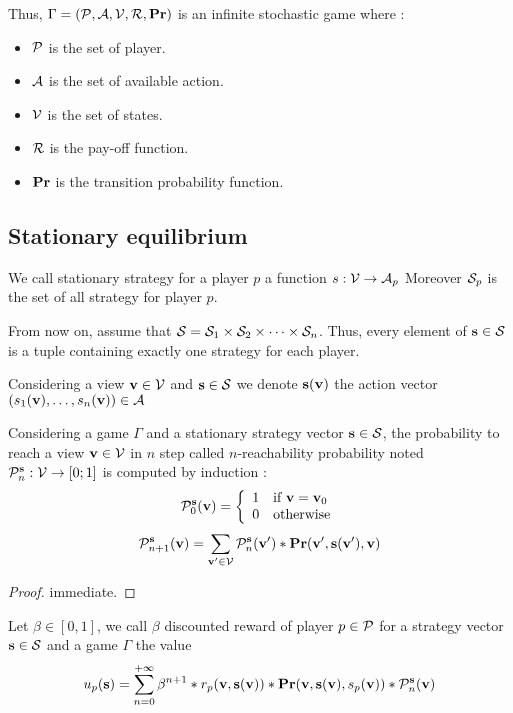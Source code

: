 Thus, $\Gamma = (\mathcal{P},\mathcal{A},\mathcal{V},\mathcal{R},\mathbf{Pr})$ is an infinite stochastic game where :
\begin{itemize}
	\item $\mathcal{P}$ is the set of player.
	\item $\mathcal{A}$ is the set of available action.
	\item $\mathcal{V}$ is the set of states.
	\item $\mathcal{R}$ is the pay-off function.
	\item $\mathbf{Pr}$ is the transition probability function.
\end{itemize} 


\subsection{Stationary equilibrium}

\begin{mydef}
	We call stationary strategy for a player $p$ a function $s : \mathcal{V} \rightarrow \mathcal{A}_p$ 
	Moreover $\mathcal{S}_p$ is the set of all strategy for player $p$. 
\end{mydef}


From now on, assume that $\mathcal{S} = \mathcal{S}_{1} \times \mathcal{S}_{2} \times \cdots \times \mathcal{S}_{n}$. Thus, every element of $\mathbf{s} \in \mathcal{S}$ is a tuple containing exactly one strategy for each player.

Considering a view $\mathbf{v} \in \mathcal{V}$ and $\mathbf{s} \in \mathcal{S}$ we denote $\mathbf{s}(\mathbf{v})$ the action vector $(s_{1}(\mathbf{v}),\ldots,s_{n}(\mathbf{v})) \in \mathcal{A}$ 
\begin{myprop}
	Considering a game $\Gamma$ and a stationary strategy vector $\mathbf{s} \in \mathcal{S}$, 
	the probability to reach a view $\mathbf{v} \in \mathcal{V}$ in $n$ step called $n$-reachability probability noted $\mathcal{P}^{\mathbf{s}}_n : \mathcal{V} \rightarrow [0;1]$ is computed by induction :
	$$\mathcal{P}^{\mathbf{s}}_0(\mathbf{v}) = \left\{\begin{array}{ll}
	1 & \mbox{if } \mathbf{v} = \mathbf{v}_0 \\
	0 & \mbox{otherwise}
	\end{array}\right.$$
	$$\mathcal{P}^{\mathbf{s}}_{n+1}(\mathbf{v}) = \sum_{\mathbf{v}' \in \mathcal{V}} \mathcal{P}^{\mathbf{s}}_{n}(\mathbf{v}') * \mathbf{Pr}(\mathbf{v}',\mathbf{s}(\mathbf{v}'),\mathbf{v})$$
\end{myprop}

\begin{proof}
	immediate.
\end{proof}


\begin{mydef}
	Let $\beta \in [0,1]$, we call $\beta$ discounted reward of player $p \in \mathcal{P}$ for a strategy vector $\mathbf{s} \in \mathcal{S}$ and a game $\Gamma$ the value 
	$$u_p(\mathbf{s}) = 	\sum_{n=0}^{+\infty}\beta^{n+1} * r_p(\mathbf{v},\mathbf{s}(\mathbf{v})) * \mathbf{Pr}(\mathbf{v},\mathbf{s}(\mathbf{v}),s_p(\mathbf{v}))*\mathcal{P}^{\mathbf{s}}_{n}(\mathbf{v}) $$
\end{mydef}

